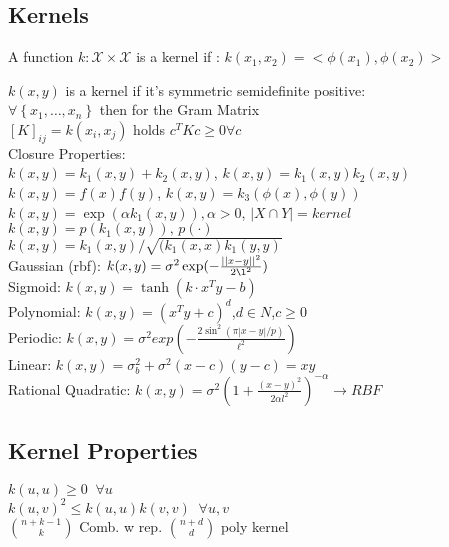 \subsection{Kernels}
    A function $k: \mathcal{X} \times \mathcal{X}$ is a kernel if : $k(x_1,x_2) = \big<\phi(x_1),\phi(x_2)\big>$
        
	$k(x,y)$ is a kernel if it's symmetric semidefinite positive:\\
	$\forall \left\{x_1, \dots, x_n \right\}$ then for the Gram Matrix \\
	${\left[K\right]}_{ij}=k(x_i,x_j)$ holds $c^TKc\geq0\forall c$\\
	Closure Properties: \\
    $k(x,y) = k_1(x,y) + k_2(x,y)$, $k(x,y) = k_1(x,y)k_2(x,y)$\\
	$k(x,y) = f(x)f(y)$, $k(x,y) = k_3(\phi(x),\phi(y))$\\
    $k(x,y) = \exp(\alpha k_1(x,y)), \alpha > 0$, $|X \cap Y| = kernel$\\
	$k(x,y) = p(k_1(x,y)), \, p(\cdot)$ \\   
	$k(x,y)=k_1(x,y)/ \sqrt{(k_1(x,x) k_1(y,y)}$\\
	Gaussian (rbf): $k(x,y) = \sigma^2 \exp( -\tfrac{||x-y||^2}{2\l^2})$ \\
	Sigmoid: $k(x,y) = \tanh(k\cdot x^Ty - b)$  \\
	Polynomial: $k(x,y) {=} (x^Ty {+} c)^d$,$d\in N$,$c\geq0$ \\
	Periodic: $k(x,y) = \sigma ^2 exp(-\frac{2\sin ^2 (\pi |x-y|/p)}{\ell ^2})$
	\\Linear: $k(x,y) = \sigma_b^2 + \sigma^2(x-c)(y-c) = xy$\\
	Rational Quadratic: $k(x, y) = \sigma^2(1+\frac{(x-y)^2}{2\alpha l^2})^{-\alpha} \rightarrow RBF$
	\subsection{Kernel Properties}
	$k(u,u) \geq 0 \; \;\forall u$\\
	$k(u,v)^2 \leq k(u,u)k(v,v) \; \; \forall u,v$\\
	$\binom{n+k-1}{k}$ Comb. w rep. $\binom{n+d}{d}$ poly kernel


